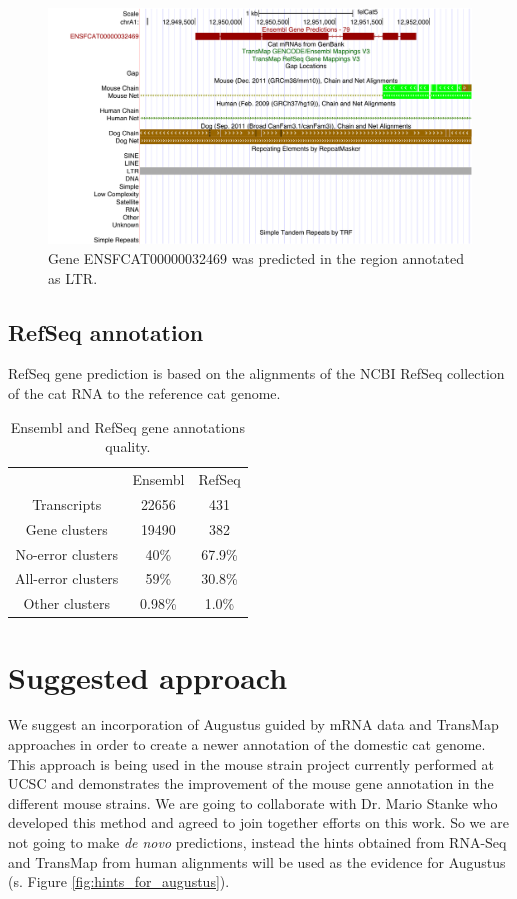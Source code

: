 \documentclass{article}
\begin{document}
\begin{figure}[h]
\centering
\includegraphics[width=\textwidth]{images/hgt_hgwdev_ede4_52c4e0.pdf}
\caption{Gene ENSFCAT00000032469 was predicted in the region annotated as LTR.}
\label{fig:gene_in_ltr}
\end{figure}


\subsection{RefSeq annotation}
RefSeq gene prediction is based on the alignments of the NCBI RefSeq collection of the cat RNA to the reference cat genome.

\begin{table}
\centering
\begin{tabular}{| c | c | c |}
\hline
&Ensembl&RefSeq\\

Transcripts& 22656 & 431\\

Gene clusters& 19490 & 382\\

No-error clusters & 40\% & 67.9\%\\

All-error clusters& 59\% & 30.8\%\\

Other clusters& 0.98\% & 1.0\%\\
\hline
\end{tabular}
\caption{Ensembl and RefSeq gene annotations quality.}
\label{table:ensembl_refseq_stats}
\end{table}

\section{Suggested approach}
We suggest an incorporation of Augustus guided by mRNA data and TransMap approaches in order to create a newer annotation of the domestic cat genome. This approach is being used in the mouse strain project currently performed at UCSC and demonstrates the improvement of the mouse gene annotation in the different mouse strains. We are going to collaborate with Dr. Mario Stanke who developed this method and agreed to join together efforts on this work.
So we are not going to make \textit{de novo} predictions, instead the hints obtained from RNA-Seq and TransMap from human alignments will be used as the evidence for Augustus (s. Figure \ref{fig:hints_for_augustus}). 
\end{document}
